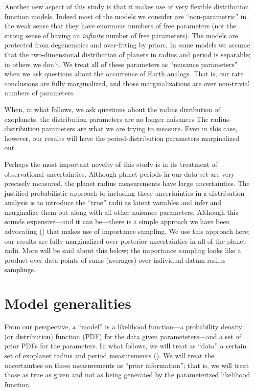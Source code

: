 \documentclass[12pt,preprint]{aastex}
\begin{document}
Another new aspect of this study is that it makes use of very flexible
distribution function models.
Indeed most of the models we consider are ``non-parametric'' in the weak sense
that they have enormous numbers of free parameters (not the strong sense of
having an \emph{infinite} number of free parameters).
The models are protected from degeneracies and over-fitting by priors.
In some models we assume that the two-dimensional distribution of planets in
radius and period is separable; in others we don't.
We treat all of these parameters as ``nuisance parameters'' when we ask
questions about the occurrence of Earth analogs.
That is, our rate conclusions are fully marginalized, and those
marginalizations are over non-trivial numbers of parameters.

When, in what follows, we ask questions about the radius disribution of
exoplanets, the distribution parameters are no longer nuisances The
radius-distribution parameters are what we are trying to measure.
Even in this case, however, our results will have the period-distribution
parameters marginalized out.

Perhaps the most important novelty of this study is in its treatment of
observational uncertainties.
Although planet periods in our data set are very precisely measured, the
planet radius measurements have large uncertainties.
The justified probabilistic approach to including these uncertainties in a
distribution analysis is to introduce the ``true'' radii as latent variables
and infer and marginalize them out along with all other nuisance parameters.
Although this sounds expensive---and it can be---there is a simple approach
we have been advocating (\cite{hogge}) that makes use of importance sampling.
We use this approach here; our results are fully marginalized over posterior
uncertainties in all of the planet radii.
More will be said about this below; the importance sampling looks like a
product over data points of sums (averages) over individual-datum radius
samplings.

\section{Model generalities}

From our perspective, a ``model'' is a likelihood function---a probability
density (or distribution) function (PDF) for the data given
parameteters---and a set of prior PDFs for the parameters.
In what follows, we will treat as ``data'' a certain set of exoplanet radius
and period measurements (\citealt{petigura}).
We will treat the uncertainties on those measurements as ``prior
information''; that is, we will treat those as true as given and not as being
generated by the parameterized likelihood function.
\end{document}
